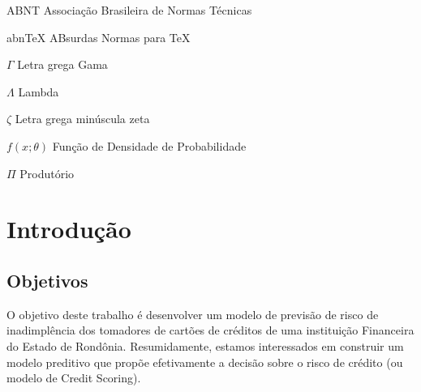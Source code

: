 \documentclass[
	12pt,				%
	openright,			%
	oneside,      %
	a4paper,			%
	english,			%
	french,				%
	spanish,			%
	brazil,				%
	]{abntex2}\usepackage[]{graphicx}\usepackage[table]{xcolor}
\theoremstyle{definition}
\begin{document}
\listoffigures*
\cleardoublepage

\listoftables*
\cleardoublepage

\begin{siglas}
  \item[ABNT] Associação Brasileira de Normas Técnicas
  \item[abnTeX] ABsurdas Normas para TeX
\end{siglas}

\begin{simbolos}
  \item[$ \Gamma $] Letra grega Gama
  \item[$ \Lambda $] Lambda
  \item[$ \zeta $] Letra grega minúscula zeta
  \item[$ f(x;\theta)$] Função de Densidade de Probabilidade
  \item[$ \Pi $] Produtório
\end{simbolos}

\tableofcontents*
\cleardoublepage

\textual

\chapter[Introdução]{Introdução}



  \section{Objetivos}

O objetivo deste trabalho é desenvolver um modelo de previsão de risco de inadimplência 
dos tomadores de cartões de créditos de uma instituição Financeira do Estado de Rondônia.
Resumidamente, estamos interessados em construir um modelo preditivo
que propõe efetivamente a decisão sobre o risco de crédito (ou modelo de Credit Scoring).
\end{document}
